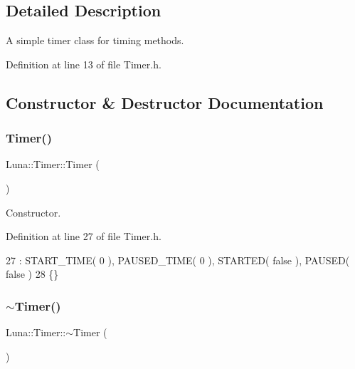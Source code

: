 \subsection{Detailed Description}
A simple timer class for timing methods. 

Definition at line 13 of file Timer.\+h.



\subsection{Constructor \& Destructor Documentation}
\mbox{\label{classLuna_1_1Timer_a8505121ba140f41121a57e4404e1d251}} 
\subsubsection{\texorpdfstring{Timer()}{Timer()}}
{\footnotesize\ttfamily Luna\+::\+Timer\+::\+Timer (\begin{DoxyParamCaption}{ }\end{DoxyParamCaption})\hspace{0.3cm}{\ttfamily [inline]}}



Constructor. 



Definition at line 27 of file Timer.\+h.


\begin{DoxyCode}
27                 : START\_TIME( 0 ), PAUSED\_TIME( 0 ), STARTED( \textcolor{keyword}{false} ), PAUSED( \textcolor{keyword}{false} )
28         \{\}
\end{DoxyCode}
\mbox{\label{classLuna_1_1Timer_af53efaf19a32dd49cc3c84671603d352}} 
\subsubsection{\texorpdfstring{$\sim$\+Timer()}{~Timer()}}
{\footnotesize\ttfamily Luna\+::\+Timer\+::$\sim$\+Timer (\begin{DoxyParamCaption}{ }\end{DoxyParamCaption})\hspace{0.3cm}{\ttfamily [inline]}}



